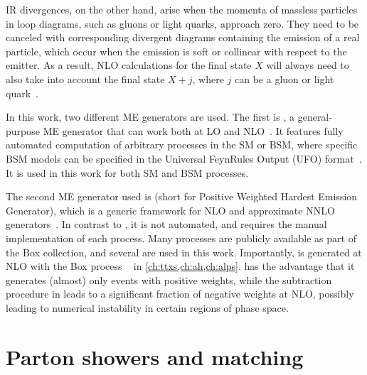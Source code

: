 IR divergences, on the other hand, arise when the momenta of massless particles in loop diagrams, such as gluons or light quarks, approach zero. They need to be canceled with corresponding divergent diagrams containing the emission of a real particle, which occur when the emission is soft or collinear with respect to the emitter. As a result, NLO calculations for the final state $X$ will always need to also take into account the final state $X+j$, where $j$ can be a gluon or light quark~\cite{Nason:2012pr}. 

In this work, two different ME generators are used. The first is \amcatnlo, a general-purpose ME generator that can work both at LO and NLO~\cite{MG5aMCatNLO:2014}. It features fully automated computation of arbitrary processes in the SM or BSM, where specific BSM models can be specified in the Universal FeynRules Output (UFO) format~\cite{Degrande:2011ua}. It is used in this work for both SM and BSM processes. 

The second ME generator used is \powheg (short for Positive Weighted Hardest Emission Generator), which is a generic framework for NLO and approximate NNLO generators~\cite{Powheg:2004,Powheg:2007,Powheg:2010}. In contrast to \amcatnlo, it is not automated, and requires the manual implementation of each process. Many processes are publicly available as part of the \powheg Box collection, and several are used in this work. Importantly, \pptt is generated at NLO with the \powheg Box process \hvq~\cite{Frixione:2007nw} in \cref{ch:ttxs,ch:ah,ch:alps}. \powheg has the advantage that it generates (almost) only events with positive weights, while the subtraction procedure in \amcatnlo leads to a significant fraction of negative weights at NLO, possibly leading to numerical instability in certain regions of phase space.

\section{Parton showers and matching}
\label{sec:mc:showering}


